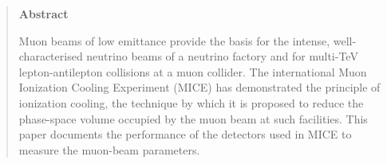 \begin{quotation}
\begin{center}
\textbf{Abstract}
\end{center}

\noindent
Muon beams of low emittance provide the basis for the intense,
well-characterised neutrino beams of a neutrino factory and for
multi-TeV lepton-antilepton collisions at a muon collider.
The international Muon Ionization Cooling Experiment (MICE) has
demonstrated the principle of ionization cooling, the technique by
which it is proposed to reduce the phase-space volume occupied by the
muon beam at such facilities. 
This paper documents the performance of the detectors used in MICE
to measure the muon-beam parameters.

\end{quotation}

